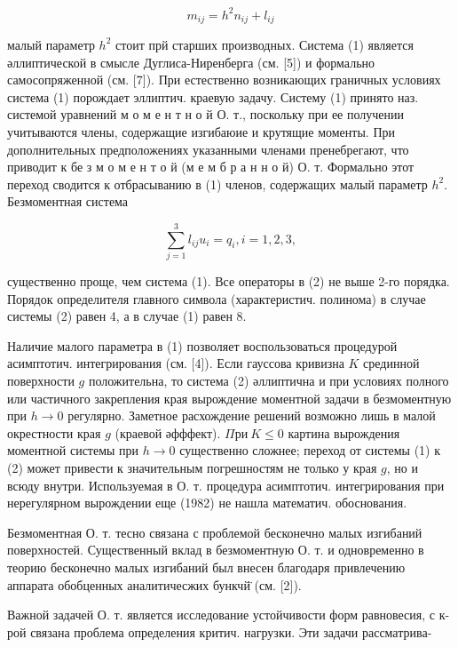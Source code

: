 \documentclass[10pt]{article}
\begin{document}
\[

m_{i j}=h^{2} n_{i j}+l_{i j}

\]



малый параметр $h^{2}$ стоит прй старших производных. Система (1) является әллиптической в смысле Дуглиса-Ниренберга (см. [5]) и формально самосопряженной (см. [7]). При естественно возникающих граничных условиях система (1) порождает эллиптич. краевую задачу. Систему (1) принято наз. системой уравнений м о м е н т н о й О. т., поскольку при ее получении учитываются члены, содержащие изгибаюие и крутящие моменты. При дополнительных предположениях указанными членами пренебрегают, что приводит к бе з м о м е н т о й (м е м б р а н н о й) О. т. Формально этот переход сводится к отбрасыванию в (1) членов, содержащих малый параметр $h^{2}$. Безмоментная система



\[

\sum_{j=1}^{3} l_{i j} u_{i}=q_{i}, i=1,2,3,

\]



существенно проще, чем система (1). Все операторы в (2) не выше 2-го порядка. Порядок определителя главного символа (характеристич. полинома) в случае системы (2) равен 4, а в случае (1) равен 8.



Наличие малого параметра в (1) позволяет воспользоваться процедурой асимптотич. интегрирования (см. [4]). Если гауссова кривизна $K$ срединной поверхности $g$ положительна, то система (2) әллиптична и при условиях полного или частичного закрепления края вырождение моментной задачи в безмоментную при $h \rightarrow 0$ регулярно. Заметное расхождение решений возможно лишь в малой окрестности края $g$ (краевой әфффект). $\Pi р и ~ K \leqslant 0$ картина вырождения моментной системы при $h \rightarrow 0$ существенно сложнее; переход от системы (1) к (2) может привести к значительным погрешностям не только у края $g$, но и всюду внутри. Используемая в О. т. процедура асимптотич. интегрирования при нерегулярном вырождении еще (1982) не нашла математич. обоснования.



Безмоментная О. т. тесно связана с проблемой бесконечно малых изгибаний поверхностей. Существенный вклад в безмоментную О. т. и одновременно в теорию бесконечно малых изгибаний был внесен благодаря привлечению аппарата обобценных аналитичесжих бункчй̈ (см. [2]).



Важной задачей О. т. является исследование устойчивости форм равновесия, с к-рой связана проблема определения критич. нагрузки. Эти задачи рассматрива-
\end{document}
